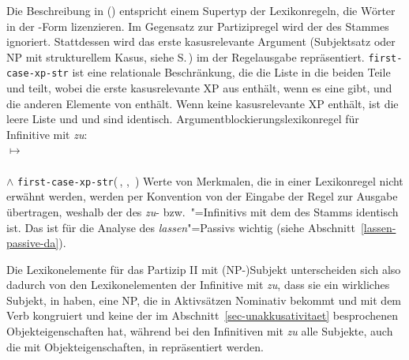 {Die Beschreibung in () entspricht einem Supertyp
der Lexikonregeln, die Wörter in der -Form
lizenzieren. Im Gegensatz zur Partizipregel wird der \daw des Stammes
ignoriert. Stattdessen wird das erste kasusrelevante Argument (Subjektsatz oder NP mit strukturellem
Kasus, siehe S.\,\pageref{page-kasusrelevante-XP}) im \subjw der Regelausgabe repräsentiert.
\texttt{first-case-xp-str} ist eine relationale Beschränkung, die die Liste
 in die beiden Teile  und  teilt, wobei 
die erste kasusrelevante XP aus  enthält, wenn es eine gibt,
und  die anderen Elemente von  enthält. Wenn  
keine kasusrelevante XP enthält, ist  die leere Liste und 
und  sind identisch.
%
\ea
\label{lr-subj-reduction}%
Argumentblockierungslexikonregel für Infinitive mit \emph{zu}:\\[1mm]
 $\mapsto$\\[1mm]
\mbox{}\hfill{}\\
\mbox{}\hfill$\wedge$ \texttt{first-case-xp-str}(\,, , \,)%
%
\z
%
Werte von Merkmalen, die in einer Lexikonregel nicht erwähnt werden, werden
per Konvention von der Eingabe der Regel zur Ausgabe übertragen,
weshalb der \daw des \emph{zu}- bzw.\ "=Infinitivs mit dem
\daw des Stamms identisch ist. Das ist für die Analyse des \emph{lassen}"=Passivs
wichtig (siehe Abschnitt~\ref{lassen-passive-da}).

Die Lexikonelemente für das Partizip II mit (NP-)Subjekt unterscheiden sich also dadurch von den
Lexikonelementen der Infinitive mit \emph{zu}, dass sie ein wirkliches Subjekt, in \subj haben, \dash eine NP, die in
Aktivsätzen Nominativ bekommt und mit dem Verb kongruiert und keine der im
Abschnitt~\ref{sec-unakkusativitaet} besprochenen Objekteigenschaften hat,
während bei den Infinitiven mit \emph{zu} alle Subjekte, \dash auch die mit
Objekteigenschaften, in \subj repräsentiert werden.

}
